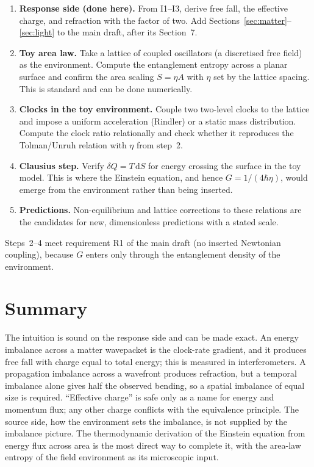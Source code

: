 \documentclass[11pt]{article}
\newcommand{\dd}{\mathrm{d}}
\theoremstyle{plain}
\theoremstyle{remark}
\begin{document}
\begin{enumerate}[1.]
\item \textbf{Response side (done here).} From I1--I3, derive free fall, the effective charge, and refraction with the factor of two. Add Sections~\ref{sec:matter}--\ref{sec:light} to the main draft, after its Section~7.
\item \textbf{Toy area law.} Take a lattice of coupled oscillators (a discretised free field) as the environment. Compute the entanglement entropy across a planar surface and confirm the area scaling $S=\eta A$ with $\eta$ set by the lattice spacing. This is standard and can be done numerically.
\item \textbf{Clocks in the toy environment.} Couple two two-level clocks to the lattice and impose a uniform acceleration (Rindler) or a static mass distribution. Compute the clock ratio relationally and check whether it reproduces the Tolman/Unruh relation with $\eta$ from step~2.
\item \textbf{Clausius step.} Verify $\delta Q=T\,\dd S$ for energy crossing the surface in the toy model. This is where the Einstein equation, and hence $G=1/(4\hbar\eta)$, would emerge from the environment rather than being inserted.
\item \textbf{Predictions.} Non-equilibrium and lattice corrections to these relations are the candidates for new, dimensionless predictions with a stated scale.
\end{enumerate}

Steps~2--4 meet requirement R1 of the main draft (no inserted Newtonian coupling), because $G$ enters only through the entanglement density of the environment.

\section{Summary}

The intuition is sound on the response side and can be made exact. An energy imbalance across a matter wavepacket is the clock-rate gradient, and it produces free fall with charge equal to total energy; this is measured in interferometers. A propagation imbalance across a wavefront produces refraction, but a temporal imbalance alone gives half the observed bending, so a spatial imbalance of equal size is required. ``Effective charge'' is safe only as a name for energy and momentum flux; any other charge conflicts with the equivalence principle. The source side, how the environment sets the imbalance, is not supplied by the imbalance picture. The thermodynamic derivation of the Einstein equation from energy flux across area is the most direct way to complete it, with the area-law entropy of the field environment as its microscopic input.
\end{document}
